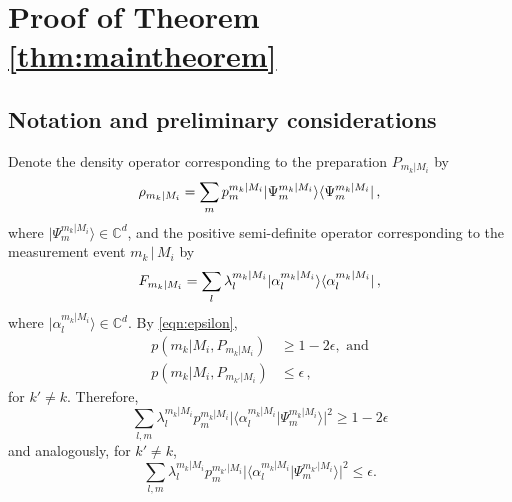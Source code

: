 \chapter{Proof of Theorem \ref{thm:maintheorem}}
\label{sec:appendix}

\section{Notation and preliminary considerations}
Denote the density operator corresponding to the preparation $P_{m_k\vert M_i}$ by 
\begin{equation}
\label{eqn:densityop}
\rho_{m_k\vert M_i} = \sum_m p_m^{m_k\vert M_i} \vert \Psi_m^{m_k\vert M_i}\rangle\langle \Psi_m^{m_k\vert M_i} \vert\thinspace ,
\end{equation} where $\vert \Psi_m^{m_k\vert M_i} \rangle \in \mathbb{C}^d$, and the positive semi-definite operator corresponding to the measurement event $m_k\,\vert\, M_i$ by
\begin{equation}
\label{eqn:mntop}
F_{m_k\vert M_i}=\sum_l \lambda_l^{m_k\vert M_i} \vert \alpha_l^{m_k\vert M_i}\rangle \langle \alpha_l^{m_k\vert M_i} \vert\thinspace ,
\end{equation} where $\vert \alpha_l^{m_k\vert M_i} \rangle \in \mathbb{C}^d$.
By \ref{eqn:epsilon},
\begin{align*}
p(m_k\vert M_i, P_{m_k\vert M_i}) & \geq 1-2\epsilon, \text{ and} \\
p(m_k\vert M_i, P_{m_{k'}\vert M_i}) & \leq \epsilon\, ,
\end{align*}
for $k'\neq k$.
Therefore,
\begin{equation}
\label{eqn:cond1}
\sum_{l,m}\lambda_l^{m_k\vert M_i}p_m^{m_k\vert M_i}\vert \langle \alpha_l^{m_k\vert M_i} \vert \Psi_m^{m_k\vert M_i} \rangle \vert^2 \geq 1-2\epsilon
\end{equation}
and analogously, for $k'\neq k$,
\begin{equation}
\label{eqn:cond2}
\sum_{l,m}\lambda_l^{m_k\vert M_i}p_m^{m_{k'}\vert M_i}\vert \langle \alpha_l^{m_k\vert M_i} \vert \Psi_m^{m_{k'}\vert M_i} \rangle \vert^2 \leq \epsilon.
\end{equation}

